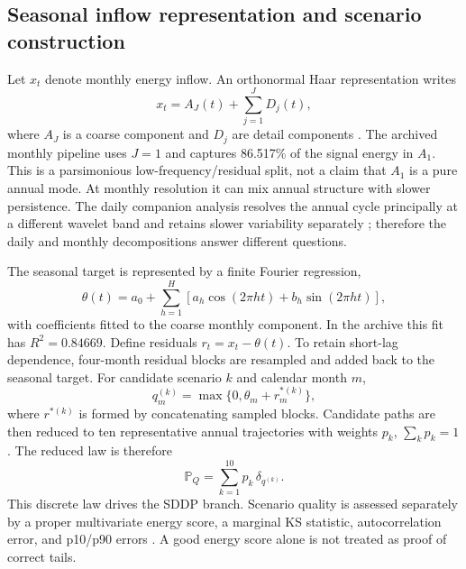 \documentclass[11pt,a4paper]{article}
\begin{document}
\subsection{Seasonal inflow representation and scenario construction}\label{sec:scenario}
Let $x_t$ denote monthly energy inflow. An orthonormal Haar representation writes
\begin{equation}
 x_t=A_J(t)+\sum_{j=1}^{J}D_j(t),
 \label{eq:haar}
\end{equation}
where $A_J$ is a coarse component and $D_j$ are detail components
\cite{mallat2009,daubechies1992}. The archived monthly pipeline uses $J=1$ and
captures 86.517\% of the signal energy in $A_1$. This is a parsimonious
low-frequency/residual split, not a claim that $A_1$ is a pure annual mode. At
monthly resolution it can mix annual structure with slower persistence. The
daily companion analysis resolves the annual cycle principally at a different
wavelet band and retains slower variability separately \cite{affognon2026wavelet};
therefore the daily and monthly decompositions answer different questions.

The seasonal target is represented by a finite Fourier regression,
\begin{equation}
 \theta(t)=a_0+\sum_{h=1}^{H}
 \left[a_h\cos(2\pi h t)+b_h\sin(2\pi h t)\right],
 \label{eq:fourier}
\end{equation}
with coefficients fitted to the coarse monthly component. In the archive this
fit has $R^2=0.84669$. Define residuals $r_t=x_t-\theta(t)$. To retain short-lag
dependence, four-month residual blocks are resampled and added back to the
seasonal target. For candidate scenario $k$ and calendar month $m$,
\begin{equation}
 q_m^{(k)}=\max\{0,\theta_m+r_{m}^{*(k)}\},
 \label{eq:scenario-reconstruct}
\end{equation}
where $r^{*(k)}$ is formed by concatenating sampled blocks. Candidate paths are
then reduced to ten representative annual trajectories with weights $p_k$,
$\sum_kp_k=1$. The reduced law is therefore
\begin{equation}
 \widehat{\mathbb P}_Q=\sum_{k=1}^{10}p_k\,\delta_{q^{(k)}}.
 \label{eq:reduced-law}
\end{equation}
This discrete law drives the SDDP branch. Scenario quality is assessed separately
by a proper multivariate energy score, a marginal KS statistic, autocorrelation
error, and p10/p90 errors \cite{kaut2007,gneiting2007}. A good energy score alone
is not treated as proof of correct tails.
\end{document}
